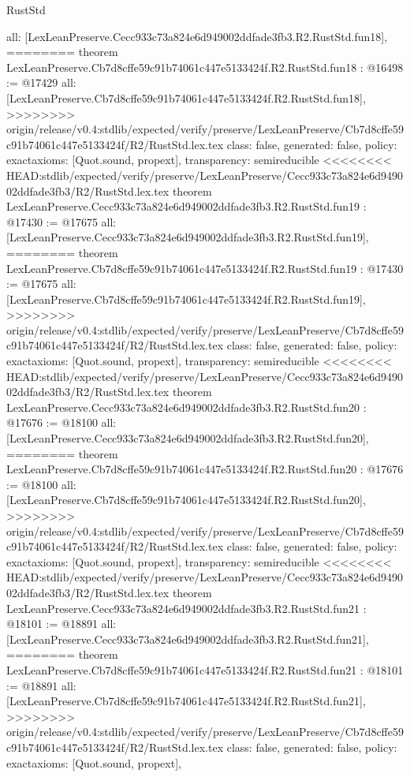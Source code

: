 \begin{lexlean}{RustStd}
\begin{coremodule}
{\begin{coremodule}
{{{{{{{{{{{{{{{{{{{{{  all: [LexLeanPreserve.Cecc933c73a824e6d949002ddfade3fb3.R2.RustStd.fun18],
========
theorem LexLeanPreserve.Cb7d8cffe59c91b74061c447e5133424f.R2.RustStd.fun18 : @16498 := @17429 {
  all: [LexLeanPreserve.Cb7d8cffe59c91b74061c447e5133424f.R2.RustStd.fun18],
>>>>>>>> origin/release/v0.4:stdlib/expected/verify/preserve/LexLeanPreserve/Cb7d8cffe59c91b74061c447e5133424f/R2/RustStd.lex.tex
  class: false,
  generated: false,
  policy: exact{axioms: [Quot.sound, propext]},
  transparency: semireducible
}
<<<<<<<< HEAD:stdlib/expected/verify/preserve/LexLeanPreserve/Cecc933c73a824e6d949002ddfade3fb3/R2/RustStd.lex.tex
theorem LexLeanPreserve.Cecc933c73a824e6d949002ddfade3fb3.R2.RustStd.fun19 : @17430 := @17675 {
  all: [LexLeanPreserve.Cecc933c73a824e6d949002ddfade3fb3.R2.RustStd.fun19],
========
theorem LexLeanPreserve.Cb7d8cffe59c91b74061c447e5133424f.R2.RustStd.fun19 : @17430 := @17675 {
  all: [LexLeanPreserve.Cb7d8cffe59c91b74061c447e5133424f.R2.RustStd.fun19],
>>>>>>>> origin/release/v0.4:stdlib/expected/verify/preserve/LexLeanPreserve/Cb7d8cffe59c91b74061c447e5133424f/R2/RustStd.lex.tex
  class: false,
  generated: false,
  policy: exact{axioms: [Quot.sound, propext]},
  transparency: semireducible
}
<<<<<<<< HEAD:stdlib/expected/verify/preserve/LexLeanPreserve/Cecc933c73a824e6d949002ddfade3fb3/R2/RustStd.lex.tex
theorem LexLeanPreserve.Cecc933c73a824e6d949002ddfade3fb3.R2.RustStd.fun20 : @17676 := @18100 {
  all: [LexLeanPreserve.Cecc933c73a824e6d949002ddfade3fb3.R2.RustStd.fun20],
========
theorem LexLeanPreserve.Cb7d8cffe59c91b74061c447e5133424f.R2.RustStd.fun20 : @17676 := @18100 {
  all: [LexLeanPreserve.Cb7d8cffe59c91b74061c447e5133424f.R2.RustStd.fun20],
>>>>>>>> origin/release/v0.4:stdlib/expected/verify/preserve/LexLeanPreserve/Cb7d8cffe59c91b74061c447e5133424f/R2/RustStd.lex.tex
  class: false,
  generated: false,
  policy: exact{axioms: [Quot.sound, propext]},
  transparency: semireducible
}
<<<<<<<< HEAD:stdlib/expected/verify/preserve/LexLeanPreserve/Cecc933c73a824e6d949002ddfade3fb3/R2/RustStd.lex.tex
theorem LexLeanPreserve.Cecc933c73a824e6d949002ddfade3fb3.R2.RustStd.fun21 : @18101 := @18891 {
  all: [LexLeanPreserve.Cecc933c73a824e6d949002ddfade3fb3.R2.RustStd.fun21],
========
theorem LexLeanPreserve.Cb7d8cffe59c91b74061c447e5133424f.R2.RustStd.fun21 : @18101 := @18891 {
  all: [LexLeanPreserve.Cb7d8cffe59c91b74061c447e5133424f.R2.RustStd.fun21],
>>>>>>>> origin/release/v0.4:stdlib/expected/verify/preserve/LexLeanPreserve/Cb7d8cffe59c91b74061c447e5133424f/R2/RustStd.lex.tex
  class: false,
  generated: false,
  policy: exact{axioms: [Quot.sound, propext]},
}}}}}}}}}}}}}}}}}}}}}}}}}
\end{coremodule}}
\end{coremodule}
\end{lexlean}

